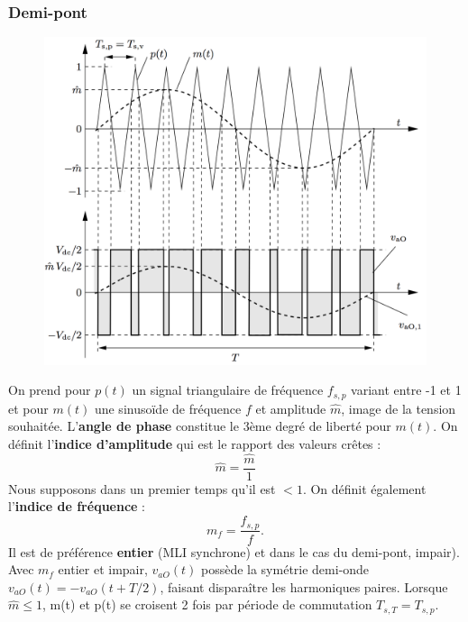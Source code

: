		\subsubsection{Demi-pont}
			\begin{figure}
			\vspace{-5mm}
			\includegraphics[scale=0.28]{ch4/17}
			\end{figure}
			On prend pour $p(t)$ un signal triangulaire de fréquence $f_{s,p}$ variant entre -1 et 1 et pour $m(t)$ une sinusoïde de fréquence $f$ et amplitude $\hat{m}$, image de la tension souhaitée. L'\textbf{angle de phase} constitue le 3ème degré de liberté pour $m(t)$. On définit l'\textbf{indice d'amplitude} qui est le rapport des valeurs crêtes :
			\begin{equation}
				\hat{m} = \frac{\hat{m}}{1}
			\end{equation}
			Nous supposons dans un premier temps qu'il est $<1$. On définit également l'\textbf{indice de fréquence} : 
			\begin{equation}
				m_f = \frac{f_{s,p}}{f}.
			\end{equation}
			Il est de préférence \textbf{entier} (MLI synchrone) et dans le cas du demi-pont, impair). Avec $m_f$ entier et impair, $v_{aO}(t)$ possède la symétrie demi-onde $v_{aO}(t) = - v_{aO}(t+T/2)$, faisant disparaître les harmoniques paires. Lorsque $\hat{m}\leq 1$, m(t) et p(t) se croisent 2 fois par période de commutation $T_{s,T} = T_{s,p}$.\\
			
